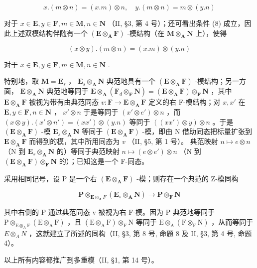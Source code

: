 \[
x. (m \otimes n) = (x. m) \otimes n, \quad y. (m \otimes n) = m \otimes (y. n)
\]

对于 \(x \in \mathbf{E}, y \in \mathbf{F}, m \in \mathbf{M}, n \in \mathbf{N}\) （II, §3, 第 4 号）；还可看出条件 (8) 成立，因此上述双模结构伴随有一个 \((\mathbf{E} \otimes_{\mathbf{A}} \mathbf{F})\) -模结构（在 \(\mathbf{M} \otimes_{\mathbf{A}} \mathbf{N}\) 上），使得

\[
(x \otimes y). (m \otimes n) = (x. m) \otimes (y. n)\tag{10}
\]

对于 \(x \in \mathbf{E}, y \in \mathbf{F}, m \in \mathbf{M}, n \in \mathbf{N}\) .

特别地，取 \(\mathbf{M} = \mathbf{E}_s\) ， \(\mathbf{E}_s \otimes_{\mathbf{A}} \mathbf{N}\) 典范地具有一个 \((\mathbf{E} \otimes_{\mathbf{A}} \mathbf{F})\) -模结构；另一方面， \(\mathbf{E} \otimes_{\mathbf{A}} \mathbf{N}\) 典范地等同于 \(\mathbf{E} \otimes_{\mathbf{A}} (\mathbf{F}_d \otimes_{\mathbf{F}} \mathbf{N}) = (\mathbf{E} \otimes_{\mathbf{A}} \mathbf{F}) \otimes_{\mathbf{F}} \mathbf{N}\) ，其中 \(\mathbf{E} \otimes_{\mathbf{A}} \mathbf{F}\) 被视为带有由典范同态 \(v: \mathbf{F} \to \mathbf{E} \otimes_{\mathbf{A}} \mathbf{F}\) 定义的右 F-模结构；对 \(x, x'\) 在 \(\mathbf{E}, y \in \mathbf{F}, n \in \mathbf{N}\) ， \(x' \otimes n\) 于是等同于 \((x' \otimes e') \otimes n\) ，而 \((x \otimes y).(x' \otimes n') = (xx') \otimes (y.n)\) 等同于 \(((xx') \otimes y) \otimes n\) 。于是 \((\mathbf{E} \otimes_{\mathbf{A}} \mathbf{F})\) -模 \(\mathbf{E}_s \otimes_{\mathbf{A}} \mathbf{N}\) 等同于 \((\mathbf{E} \otimes_{\mathbf{A}} \mathbf{F})\) -模，即由 N 借助同态把标量扩张到 \(\mathbf{E} \otimes_{\mathbf{A}} \mathbf{F}\) 而得到的模，其中所用同态为 \(v\) （II, §5, 第 1 号）。 典范映射 \(n \mapsto e \otimes n\) （N 到 \(\mathbf{E}_s \otimes_{\mathbf{A}} \mathbf{N}\) 的）等同于典范映射 \(n \mapsto (e \otimes e') \otimes n\) （N 到 \((\mathbf{E} \otimes_{\mathbf{A}} \mathbf{F}) \otimes_{\mathbf{F}} \mathbf{N}\) 的）；已知这是一个 F-同态。

采用相同记号，设 P 是一个右 \((\mathbf{E} \otimes_{\mathbf{A}} \mathbf{F})\) -模；则存在一个典范的 Z-模同构

\[
\mathbf {P} \otimes_ {\mathbf {E} \otimes_ {\mathbf {A}} F} (\mathbf {E} _ {s} \otimes_ {\mathbf {A}} \mathbf {N}) \rightarrow \mathbf {P} \otimes_ {\mathbf {F}} \mathbf {N}\tag{11}
\]

其中右侧的 P 通过典范同态 v 被视为右 F-模。因为 P 典范地等同于 \(\mathrm{P}\otimes_{\mathrm{E}\otimes_{\mathrm{A}}\mathrm{F}}(\mathrm{E}\otimes_{\mathrm{A}}\mathrm{F})\) ，且 \((\mathrm{E}\otimes_{\mathrm{A}}\mathrm{F})\otimes_{\mathrm{F}}\mathrm{N}\) 等同于 \(\mathrm{E}\otimes_{\mathrm{A}}(\mathrm{F}\otimes_{\mathrm{F}}\mathrm{N})\) ，从而等同于 \(E\otimes_{A}N\) ，这就建立了所述的同构（II, §3, 第 8 号, 命题 8 及 II, §3, 第 4 号, 命题 4）。

以上所有内容都推广到多重模（II, §1, 第 14 号）。

